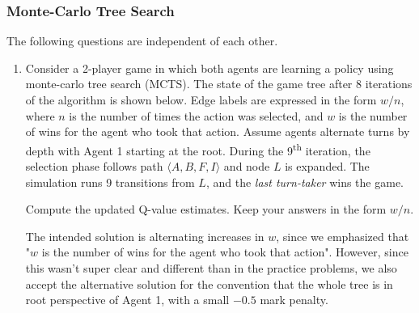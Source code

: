 \clearpage

\subsubsection{Monte-Carlo Tree Search}
The following questions are independent of each other.
\begin{enumerate}
\item \points[4] Consider a 2-player game in which both agents are learning a policy using monte-carlo tree search (MCTS). The state of the game tree after 8 iterations of the algorithm is shown below. Edge labels are expressed in the form $w/n$, where $n$ is the number of times the action was selected, and $w$ is the number of wins for the agent who
took that action. Assume agents alternate turns by depth with Agent 1 starting at the root. During the 9\textsuperscript{th} iteration, the
selection phase follows path $\langle A, B, F, I \rangle$ and node $L$ is expanded. The simulation
runs 9 transitions from $L$, and the \textit{last turn-taker} wins the game.

\begin{figure}[H]
  \centering
\end{figure}
\noindent
Compute the updated Q-value estimates. Keep your answers in the form $w/n$.
\begin{solution}
The intended solution is alternating increases in $w$, since we emphasized that "$w$ is the number of wins for the agent who took that action". However, since this wasn't super clear and different than in the practice problems, we also accept the alternative solution for the convention that the whole tree is in root perspective of Agent 1, with a small $-0.5$ mark penalty.


\end{solution}
\end{enumerate}
